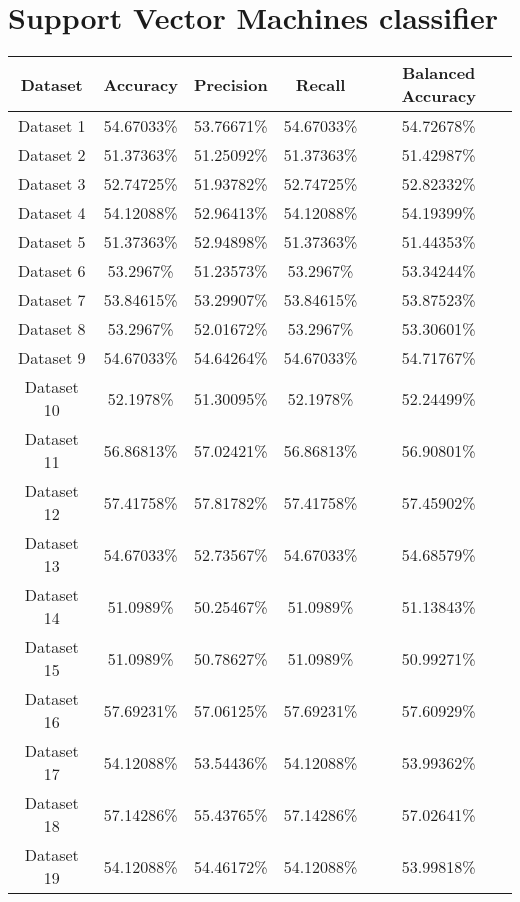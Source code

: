 \section{Support Vector Machines classifier}
\begin{center}
\begin{tabular}{ |c||c|c|c|c| } 
    \hline
    Dataset & Accuracy & Precision & Recall & Balanced Accuracy\\ 
    \hline\hline
    Dataset 1& 54.67033\%& 53.76671\%& 54.67033\%& 54.72678\%\\
    \hline
    Dataset 2& 51.37363\%& 51.25092\%& 51.37363\%& 51.42987\%\\
    \hline
    Dataset 3& 52.74725\%& 51.93782\%& 52.74725\%& 52.82332\%\\
    \hline
    Dataset 4& 54.12088\%& 52.96413\%& 54.12088\%& 54.19399\%\\
    \hline
    Dataset 5& 51.37363\%& 52.94898\%& 51.37363\%& 51.44353\%\\
    \hline
    Dataset 6& 53.2967\%& 51.23573\%& 53.2967\%& 53.34244\%\\
    \hline
    Dataset 7& 53.84615\%& 53.29907\%& 53.84615\%& 53.87523\%\\
    \hline
    Dataset 8& 53.2967\%& 52.01672\%& 53.2967\%& 53.30601\%\\
    \hline
    Dataset 9& 54.67033\%& 54.64264\%& 54.67033\%& 54.71767\%\\
    \hline
    Dataset 10& 52.1978\%& 51.30095\%& 52.1978\%& 52.24499\%\\
    \hline
    Dataset 11& 56.86813\%& 57.02421\%& 56.86813\%& 56.90801\%\\
    \hline
    Dataset 12& 57.41758\%& 57.81782\%& 57.41758\%& 57.45902\%\\
    \hline
    Dataset 13& 54.67033\%& 52.73567\%& 54.67033\%& 54.68579\%\\
    \hline
    Dataset 14& 51.0989\%& 50.25467\%& 51.0989\%& 51.13843\%\\
    \hline
    Dataset 15& 51.0989\%& 50.78627\%& 51.0989\%& 50.99271\%\\
    \hline
    Dataset 16& 57.69231\%& 57.06125\%& 57.69231\%& 57.60929\%\\
    \hline
    Dataset 17& 54.12088\%& 53.54436\%& 54.12088\%& 53.99362\%\\
    \hline
    Dataset 18& 57.14286\%& 55.43765\%& 57.14286\%& 57.02641\%\\
    \hline
    Dataset 19& 54.12088\%& 54.46172\%& 54.12088\%& 53.99818\%\\

\end{tabular}
\end{center}
